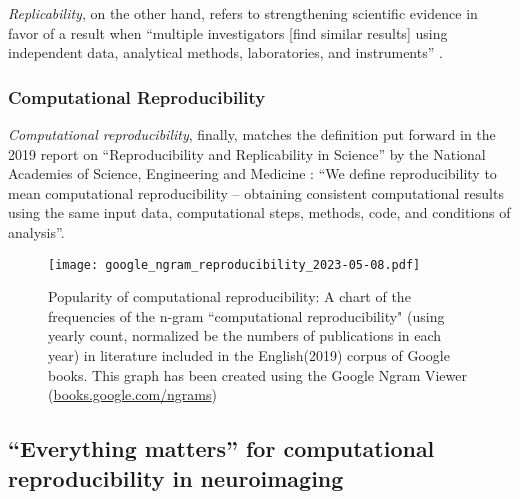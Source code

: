 \textit{Replicability}, on the other hand, refers to strengthening scientific evidence in favor of a result when ``multiple investigators [find similar results] using independent data, analytical methods, laboratories, and instruments''  \citep{peng2006}.

\subsubsection{Computational Reproducibility}

\textit{Computational reproducibility}, finally, matches the definition put forward in the 2019 report on ``Reproducibility and Replicability in Science'' by the National Academies of Science, Engineering and Medicine \citep{engineering2019reproducibility}: ``We define reproducibility to mean computational reproducibility – obtaining consistent computational results using the same input data, computational steps, methods, code, and conditions of analysis''.


\begin{figure}
	\centering
	\texttt{[image: google\_ngram\_reproducibility\_2023-05-08.pdf]}
	\caption[Computational reproducibility in the literature]{Popularity of computational reproducibility: A chart of the frequencies of the n-gram ``computational reproducibility" (using yearly count, normalized be the numbers of publications in each year) in literature included in the English(2019) corpus of Google books. This graph has been created using the Google Ngram Viewer (\href{https://books.google.com/ngrams/info}{books.google.com/ngrams}) \citep{michel2011quantitative}}
	\label{fig:ngram}
\end{figure}


\subsection{``Everything matters'' for computational reproducibility in neuroimaging}


